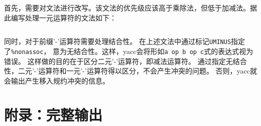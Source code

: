 \documentclass[a4paper,twoside]{article}
\begin{document}
\begin{spacing}{1.2}
首先，需要对文法进行改写。该文法的优先级应该高于乘除法，但低于加减法。据此编写处理一元运算符的文法如下：
\inputminted{c}{text/grammar.txt}

同时，对于前缀'-'运算符需要处理结合性。
在上述文法中通过标记\texttt{UMINUS}指定了\texttt{\%nonassoc}，
意为无结合性。这样，yacc会将形如\texttt{a op b op c}式的表达式视为错误。
这样做的目的在于区分二元'-'运算符，即减法运算符。
通过指定无结合性，二元'-'运算符和一元'-'运算符得以区分，不会产生冲突的问题。
否则，yacc就会输出产生移入规约冲突的信息。

\appendix
\section{附录：完整输出}
\label{sec:fullout}

\inputminted{bnf}{text/output.txt}

\end{spacing}
\end{document}
